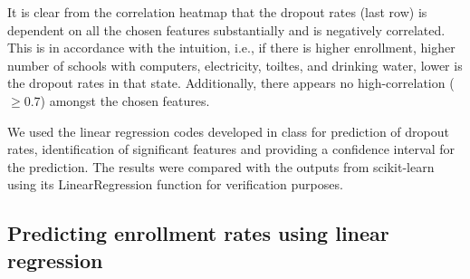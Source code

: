 \documentclass{article}
\begin{document}
It is clear from the correlation heatmap that the dropout rates (last row) is dependent on all the chosen features substantially and is negatively correlated.  This is in accordance with the intuition, i.e., if there is higher enrollment, higher number of schools with computers, electricity, toiltes, and drinking water, lower is the dropout rates in that state. Additionally, there appears no high-correlation ($\geq$0.7) amongst the chosen features. 

We used the linear regression codes developed in class for prediction of dropout rates, identification of significant features and providing a confidence interval for the prediction. The results were compared with the outputs from scikit-learn \cite{scikit-learn} using its LinearRegression function for verification purposes.

\subsection{Predicting enrollment rates using linear regression}
\end{document}
